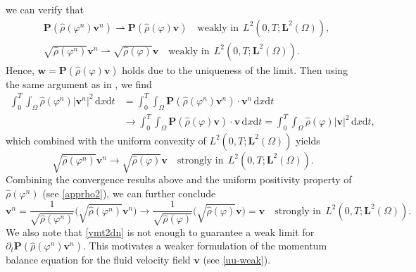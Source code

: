 \documentclass[11pt,reqno]{amsart}
\def\vv{\bm{v}}
\begin{document}
%
we can verify that
%
\begin{align*}
    & \bm{P}(\widehat{\rho}(\varphi^n)\bm{v}^{n})\rightharpoonup \bm{P}(\widehat{\rho}(\varphi)\bm{v}) \quad \text{weakly in} \ \ L^2(0,T;\bm{L}^2(\Omega)),\\
    & \sqrt{\widehat{\rho}(\varphi^n)}\bm{v}^{n}\rightharpoonup  \sqrt{\widehat{\rho}(\varphi)}\bm{v} \quad \text{weakly in} \ \ L^2(0,T;\bm{L}^2(\Omega)).
\end{align*}
%
Hence, $\bm{w}=\bm{P}(\widehat{\rho}(\varphi)\bm{v})$ holds due to the uniqueness of the limit. Then using the same argument as in \cite[Section 5.1]{ADG2013}, we find
%
\begin{align*}
\int_0^T\int_\Omega \widehat{\rho}(\varphi^n)|\bm{v}^{n}|^2\,\mathrm{d}x\mathrm{d}t
& =\int_0^T\int_\Omega
\bm{P}(\widehat{\rho}(\varphi^n)\bm{v}^{n})\cdot \bm{v}^{n}\,\mathrm{d}x\mathrm{d}t
\\
& \to \int_0^T\int_\Omega
\bm{P}(\widehat{\rho}(\varphi)\bm{v})\cdot \bm{v}\,\mathrm{d}x\mathrm{d}t = \int_0^T\int_\Omega \widehat{\rho}(\varphi)|\bm{v}|^2\,\mathrm{d}x\mathrm{d}t,
\end{align*}
%
which combined with the uniform convexity of   $L^2(0,T;\bm{L}^2(\Omega))$
yields
$$
\sqrt{\widehat{\rho}(\varphi^n)}\bm{v}^{n}\to  \sqrt{\widehat{\rho}(\varphi)}\bm{v} \quad \text{strongly in} \ \ L^2(0,T;\bm{L}^2(\Omega)).
$$
Combining the convergence results above and the uniform positivity property of $\widehat{\rho}(\varphi^n)$ (see \eqref{apprho2}), we can further conclude
$$
\bm{v}^{n}= \frac{1}{\sqrt{\widehat{\rho}(\varphi^n)}} \Big(\sqrt{\widehat{\rho}(\varphi^n)}\bm{v}^{n}\Big) \to \frac{1}{\sqrt{\widehat{\rho}(\varphi)}} \Big(\sqrt{\widehat{\rho}(\varphi)}\bm{v}\Big)=\bm{v}\quad \text{strongly in}\ \ L^2(0,T;\bm{L}^2(\Omega)).
$$
We also note that \eqref{vmt2dn} is not enough to guarantee a weak limit for $\partial_{t} \bm{P}(\widehat{\rho}(\varphi^n)\bm{v}^{n})$. This motivates a weaker formulation of the momentum balance equation for the fluid velocity field $\vv$ (see \eqref{uu-weak}).
\end{document}

